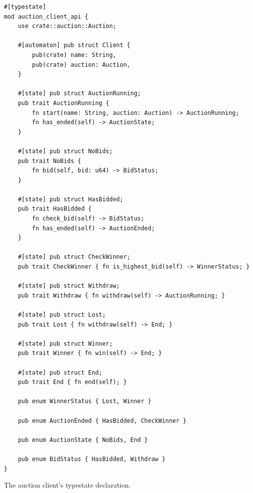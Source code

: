 \begin{listing}
    \begin{verbatim}
#[typestate]
mod auction_client_api {
    use crate::auction::Auction;

    #[automaton] pub struct Client {
        pub(crate) name: String,
        pub(crate) auction: Auction,
    }

    #[state] pub struct AuctionRunning;
    pub trait AuctionRunning {
        fn start(name: String, auction: Auction) -> AuctionRunning;
        fn has_ended(self) -> AuctionState;
    }

    #[state] pub struct NoBids;
    pub trait NoBids {
        fn bid(self, bid: u64) -> BidStatus;
    }

    #[state] pub struct HasBidded;
    pub trait HasBidded {
        fn check_bid(self) -> BidStatus;
        fn has_ended(self) -> AuctionEnded;
    }

    #[state] pub struct CheckWinner;
    pub trait CheckWinner { fn is_highest_bid(self) -> WinnerStatus; }

    #[state] pub struct Withdraw;
    pub trait Withdraw { fn withdraw(self) -> AuctionRunning; }

    #[state] pub struct Lost;
    pub trait Lost { fn withdraw(self) -> End; }

    #[state] pub struct Winner;
    pub trait Winner { fn win(self) -> End; }

    #[state] pub struct End;
    pub trait End { fn end(self); }

    pub enum WinnerStatus { Lost, Winner }

    pub enum AuctionEnded { HasBidded, CheckWinner }

    pub enum AuctionState { NoBids, End }

    pub enum BidStatus { HasBidded, Withdraw }
}
    \end{verbatim}
    \caption{The auction client's typestate declaration.}
    \label{lst:typestate-auction-client}
\end{listing}


